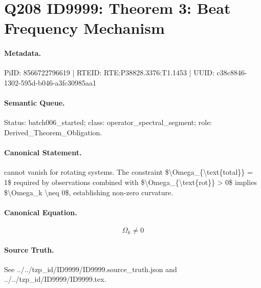 \section*{Q208 ID9999: Theorem 3: Beat Frequency Mechanism}
\paragraph{Metadata.}
PiID: 8566722796619 | RTEID: RTE:P38828.3376:T1.1453 | UUID: c38c8846-1302-595d-b046-a3fc30985aa1

\paragraph{Semantic Queue.}
Status: batch006\_started; class: operator\_spectral\_segment; role: Derived\_Theorem\_Obligation.

\paragraph{Canonical Statement.}
cannot vanish for rotating systems. The constraint \$\textbackslash{}Omega\_\{\textbackslash{}text\{total\}\} = 1\$ required by observations combined with \$\textbackslash{}Omega\_\{\textbackslash{}text\{rot\}\} > 0\$ implies \$\textbackslash{}Omega\_k \textbackslash{}neq 0\$, establishing non-zero curvature.

\paragraph{Canonical Equation.}
\[
\Omega_k \neq 0
\]

\paragraph{Source Truth.}
See ../../tzp\_id/ID9999/ID9999.source\_truth.json and ../../tzp\_id/ID9999/ID9999.tex.
